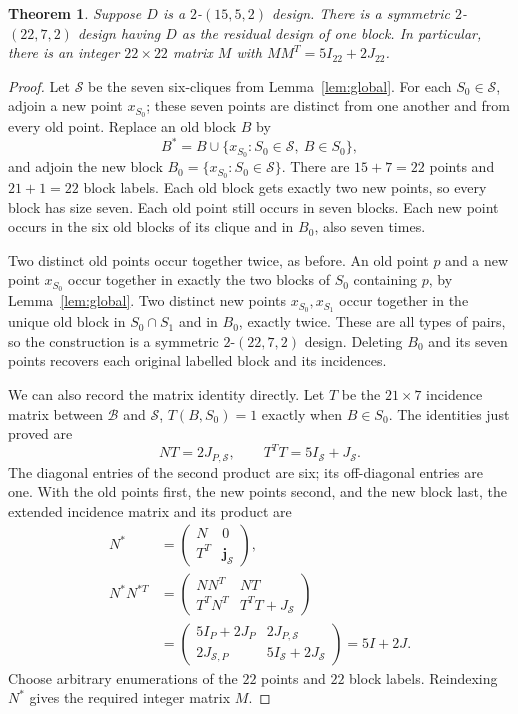 \documentclass[11pt]{article}
\newcommand\cB{{\mathcal B}}
\newcommand\cS{{\mathcal S}}
\newcommand\Zj{{\mathbf j}}
\newcommand\pmat[1]{\begin{pmatrix} #1 \end{pmatrix}}
\newtheorem{theorem}{Theorem}[section]
\theoremstyle{definition}
\begin{document}
\begin{theorem}\label{thm:embedding}
\textup{\cite[Theorems 2.1 and 3.2, at $k=5$]{HC}}
Suppose $D$ is a $2$-$(15,5,2)$ design. There is a symmetric
$2$-$(22,7,2)$ design having $D$ as the residual design of one block.
In particular, there is an integer $22\times22$ matrix $M$ with
$MM^T=5I_{22}+2J_{22}$.
\end{theorem}
\begin{proof}
Let $\cS$ be the seven six-cliques from Lemma~\ref{lem:global}.
For each $S_0\in\cS$, adjoin a new point $x_{S_0}$; these seven points
are distinct from one another and from every old point. Replace an old
block $B$ by
\[
 B^*=B\cup\{x_{S_0}:S_0\in\cS,\ B\in S_0\},
\]
and adjoin the new block $B_0=\{x_{S_0}:S_0\in\cS\}$.
There are $15+7=22$ points and $21+1=22$ block labels. Each old block
gets exactly two new points, so every block has size seven. Each old
point still occurs in seven blocks. Each new point occurs in the six
old blocks of its clique and in $B_0$, also seven times.

Two distinct old points occur together twice, as before. An old point
$p$ and a new point $x_{S_0}$ occur together in exactly the two blocks
of $S_0$ containing $p$, by Lemma~\ref{lem:global}. Two distinct new
points $x_{S_0},x_{S_1}$ occur together in the unique old block in
$S_0\cap S_1$ and in $B_0$, exactly twice. These are all types of
pairs, so the construction is a symmetric $2$-$(22,7,2)$ design.
Deleting $B_0$ and its seven points recovers each original labelled
block and its incidences.

We can also record the matrix identity directly. Let $T$ be the
$21\times7$ incidence matrix between $\cB$ and $\cS$,
$T(B,S_0)=1$ exactly when $B\in S_0$. The identities just proved are
\[
 NT=2J_{P,\cS},\qquad
 T^TT=5I_{\cS}+J_{\cS}.
\]
The diagonal entries of the second product are six; its off-diagonal
entries are one. With the old points first, the new points second,
and the new block last, the extended incidence matrix and its product
are
\begin{equation}\label{eq:extended}
\begin{aligned}
 N^*&=\pmat{N&0\\T^T&\Zj_{\cS}},\\
 N^*N^{*T}
 &=\pmat{NN^T&NT\\T^TN^T&T^TT+J_{\cS}}\\
 &=\pmat{5I_P+2J_P&2J_{P,\cS}\\
 2J_{\cS,P}&5I_{\cS}+2J_{\cS}}=5I+2J.
\end{aligned}
\end{equation}
Choose arbitrary enumerations of the $22$ points and $22$ block
labels. Reindexing $N^*$ gives the required integer matrix $M$.
\end{proof}
\end{document}
